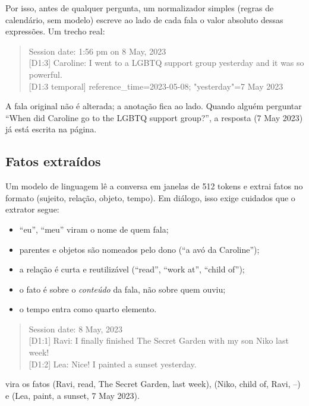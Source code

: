 \documentclass[11pt]{article}
\begin{document}
Por isso, antes de qualquer pergunta, um normalizador simples (regras de
calendário, sem modelo) escreve ao lado de cada fala o valor absoluto dessas
expressões. Um trecho real:

\begin{quote}\small\ttfamily
Session date: 1:56 pm on 8 May, 2023\\
{[D1:3]} Caroline: I went to a LGBTQ support group yesterday and it was so powerful.\\
{[D1:3 temporal]} reference\_time=2023-05-08; "yesterday"=7 May 2023
\end{quote}

A fala original não é alterada; a anotação fica ao lado. Quando alguém
perguntar ``When did Caroline go to the LGBTQ support group?'', a resposta
(7 May 2023) já está escrita na página.

\subsection{Fatos extraídos}

Um modelo de linguagem lê a conversa em janelas de 512 tokens e extrai fatos
no formato (sujeito, relação, objeto, tempo). Em diálogo, isso exige cuidados
que o extrator segue:
\begin{itemize}[nosep]
\item ``eu'', ``meu'' viram o nome de quem fala;
\item parentes e objetos são nomeados pelo dono (``a avó da Caroline'');
\item a relação é curta e reutilizável (``read'', ``work at'', ``child of'');
\item o fato é sobre o \emph{conteúdo} da fala, não sobre quem ouviu;
\item o tempo entra como quarto elemento.
\end{itemize}

\begin{exemplo}
\begin{quote}\small\ttfamily
Session date: 8 May, 2023\\
{[D1:1]} Ravi: I finally finished The Secret Garden with my son Niko last week!\\
{[D1:2]} Lea: Nice! I painted a sunset yesterday.
\end{quote}
vira os fatos
(Ravi, read, The Secret Garden, last week),
(Niko, child of, Ravi, --) e
(Lea, paint, a sunset, 7 May 2023).
\end{exemplo}
\end{document}
